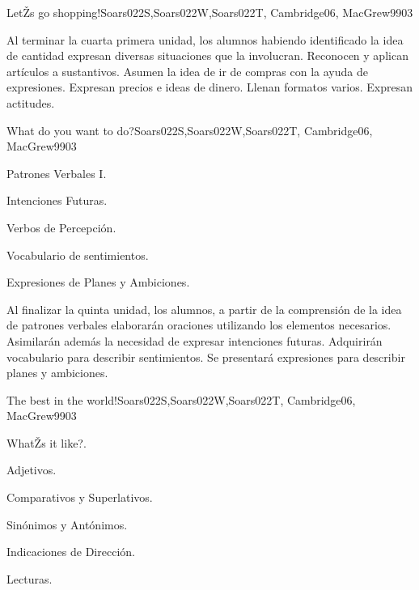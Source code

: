 \begin{syllabus}
\begin{unit}{LetŽs go shopping!}{Soars022S,Soars022W,Soars022T, Cambridge06, MacGrew99}{0}{3}
   \begin{unitgoals}
      \item Al terminar la cuarta primera unidad, los alumnos habiendo identificado la idea de cantidad expresan diversas situaciones que la involucran. Reconocen y aplican artículos a sustantivos. Asumen la idea de ir de compras con la ayuda de expresiones. Expresan precios e ideas de dinero. Llenan formatos varios. Expresan actitudes.
   \end{unitgoals}

\end{unit}

\begin{unit}{What do you want to do?}{Soars022S,Soars022W,Soars022T, Cambridge06, MacGrew99}{0}{3}
   \begin{topics}
      \item Patrones Verbales I.
      \item Intenciones Futuras.
      \item Verbos de Percepción.
      \item Vocabulario de sentimientos.
      \item Expresiones de Planes y Ambiciones.
   \end{topics}

   \begin{unitgoals}
      \item Al finalizar la quinta unidad, los alumnos, a partir de la comprensión de la idea de patrones verbales elaborarán oraciones utilizando los elementos necesarios. Asimilarán además la necesidad de expresar intenciones futuras. Adquirirán vocabulario para describir sentimientos. Se presentará expresiones para describir planes y ambiciones.
   \end{unitgoals}
\end{unit}

\begin{unit}{The best in the world!}{Soars022S,Soars022W,Soars022T, Cambridge06, MacGrew99}{0}{3}
   \begin{topics}
      \item WhatŽs it like?.
      \item Adjetivos.
      \item Comparativos y Superlativos.
      \item Sinónimos y Antónimos. 
      \item Indicaciones de Dirección.
      \item Lecturas.
   \end{topics}


\end{unit}
\end{syllabus}

